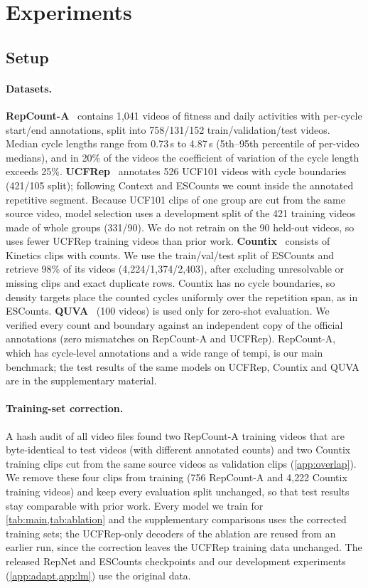 \section{Experiments}
\label{sec:experiments}

\subsection{Setup}
\paragraph{Datasets.}
\textbf{RepCount-A}~\cite{hu2022transrac} contains 1{,}041 videos of fitness
and daily activities with per-cycle start/end annotations, split into
758/131/152 train/validation/test videos. Median cycle lengths range from
0.73\,s to 4.87\,s (5th--95th percentile of per-video medians), and in 20\% of the
videos the coefficient of variation of the cycle length exceeds 25\%.
\textbf{UCFRep}~\cite{zhang2020context} annotates 526 UCF101 videos with cycle
boundaries (421/105 split); following Context and ESCounts we count inside the
annotated repetitive segment. Because UCF101 clips of one group are cut from the
same source video, model selection uses a development split of the 421 training
videos made of whole groups (331/90). We do not retrain on the 90 held-out
videos, so \method uses fewer UCFRep training videos than prior work.
\textbf{Countix}~\cite{dwibedi2020repnet} consists of Kinetics clips with counts.
We use the train/val/test split of ESCounts and retrieve 98\% of its videos
(4{,}224/1{,}374/2{,}403), after excluding unresolvable or missing clips and exact
duplicate rows. Countix has no cycle boundaries,
so density targets place the counted cycles uniformly over the repetition span,
as in ESCounts.
\textbf{QUVA}~\cite{runia2018realworld} (100 videos) is used only for zero-shot
evaluation. We verified every count and boundary against an
independent copy of the official annotations (zero mismatches on RepCount-A and
UCFRep). RepCount-A, which has cycle-level annotations and a wide
range of tempi, is our main benchmark; the test results of the same models on
UCFRep, Countix and QUVA are in the supplementary material.

\paragraph{Training-set correction.}
A hash audit of all video files found two RepCount-A training videos that are
byte-identical to test videos (with different annotated counts) and two Countix
training clips cut from the same source videos as validation clips
(\cref{app:overlap}). We remove these four clips from training (756 RepCount-A and
4{,}222 Countix training videos) and keep every evaluation split unchanged, so
that test results stay comparable with prior work. Every model we train for
\cref{tab:main,tab:ablation} and the supplementary comparisons uses the corrected
training sets; the UCFRep-only decoders of the ablation are reused from an earlier
run, since the correction leaves the UCFRep training data unchanged. The released
RepNet and ESCounts checkpoints and our development experiments
(\cref{app:adapt,app:lm}) use the original data.

